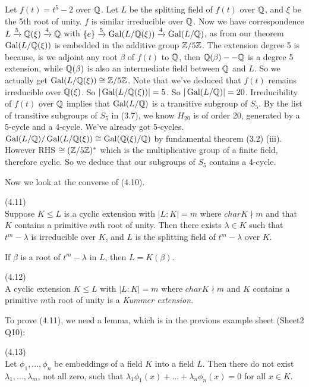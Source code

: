 \documentclass[a4paper]{article}
\begin{document}
\begin{eg}
Let $f(t) = t^5-2$ over $\mathbb{Q}$. Let $L$ be the splitting field of $f(t)$ over $\mathbb{Q}$, and $\xi$ be the 5th root of unity. $f$ is similar irreducible over $\mathbb{Q}$. Now we have correspondence $L \xrightarrow{5} \mathbb{Q}(\xi) \xrightarrow{4} \mathbb{Q}$ with $\{e\} \xrightarrow{5} \operatorname{Gal}(L/\mathbb{Q}(\xi)) \xrightarrow{4} \operatorname{Gal}(L/\mathbb{Q})$, as from our theorem $\operatorname{Gal}(L/\mathbb{Q}(\xi))$ is embedded in the additive group $\mathbb{Z}/5\mathbb{Z}$. The extension degree 5 is because, is we adjoint any root $\beta$ of $f(t)$ to $\mathbb{Q}$, then $\mathbb{Q}(\beta) -- \mathbb{Q}$ is a degree 5 extension, while $\mathbb{Q}(\beta)$ is also an intermediate field between $\mathbb{Q}$ and $L$. So we actually get $\operatorname{Gal}(L/\mathbb{Q}(\xi)) \cong \mathbb{Z}/5\mathbb{Z}$. Note that we've deduced that $f(t)$ remains irreducible over $\mathbb{Q}(\xi)$. So $|\operatorname{Gal}(L/\mathbb{Q}(\xi))| = 5$. So $|\operatorname{Gal}(L/\mathbb{Q})| = 20$. Irreducibility of $f(t)$ over $\mathbb{Q}$ implies that $\operatorname{Gal}(L/\mathbb{Q})$ is a transitive subgroup of $S_5$. By the list of transitive subgroups of $S_5$ in (3.7), we know $H_{20}$ is of order 20, generated by a 5-cycle and a 4-cycle. We've already got 5-cycles. $\operatorname{Gal}(L/\mathbb{Q}) / \operatorname{Gal}(L/\mathbb{Q}(\xi)) \cong \operatorname{Gal}(\mathbb{Q}(\xi)/\mathbb{Q})$ by fundamental theorem (3.2) (iii). However RHS $\cong (\mathbb{Z}/5\mathbb{Z})^*$ which is the multiplicative group of a finite field, therefore cyclic. So we deduce that our subgroups of $S_5$ contains a 4-cycle.
\end{eg}

Now we look at the converse of (4.10).

\begin{thm} (4.11)\\
Suppose $K\leq L$ is a cyclic extension with $|L:K| = m$ where $char K \nmid m$ and that $K$ contains a primitive $m$th root of unity. Then there exists $\lambda \in K$ such that $t^m - \lambda$ is irreducible over $K$, and $L$ is the splitting field of $t^m-\lambda$ over $K$.

If $\beta$ is a root of $t^m-\lambda$ in $L$, then $L=K(\beta)$.
\end{thm}

\begin{defi} (4.12)\\
A cyclic extension $K \leq L$ with $|L:K| = m$ where $char K \nmid m$ and $K$ contains a primitive $m$th root of unity is a \emph{Kummer extension}.
\end{defi}

To prove (4.11), we need a lemma, which is in the previous example sheet (Sheet2 Q10):
\begin{lemma} (4.13)\\
Let $\phi_1,...,\phi_n$ be embeddings of a field $K$ into a field $L$. Then there do not exist $\lambda_1,...,\lambda_m$, not all zero, such that $\lambda_1\phi_1(x) + ...+\lambda_n\phi_n(x) = 0$ for all $x \in K$.
\end{lemma}
\end{document}
